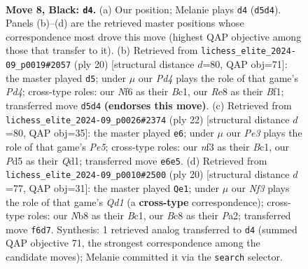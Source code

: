 \documentclass[11pt]{article}
\begin{document}
\begin{figure}[p]\centering
\begin{subfigure}{0.46\textwidth}\centering
\resizebox{\linewidth}{!}{%
\newchessgame
\chessboard[
  setfen={rnbqr1k1/pp2bppp/4pn2/2pp4/2P5/1P3NPB/P2PPPKP/RNBQ1R2 b - - 3 8},
  showmover=false,
  pgfstyle=straightmove, color=movearrow, markmove={d5-d4}
]}
\caption{}
\end{subfigure}\hfill
\begin{subfigure}{0.46\textwidth}\centering
\resizebox{\linewidth}{!}{%
\newchessgame
\chessboard[
  setfen={r2qkbnr/pb1npp1p/1p4pP/2p5/3PP3/2N2N2/PP3PP1/R1BQKB1R w KQkq - 1 11},
  showmover=false,
  pgfstyle=straightmove, color=movearrow, markmove={d4-d5}
]}
\caption{}
\end{subfigure}
\\[4pt]
\begin{subfigure}{0.46\textwidth}\centering
\resizebox{\linewidth}{!}{%
\newchessgame
\chessboard[
  setfen={r1b1nrk1/pp1n1pbp/1qp3p1/2p1P3/4P3/2N2NPP/PP3PB1/R1BQ1RK1 w - - 1 12},
  showmover=false,
  pgfstyle=straightmove, color=movearrow, markmove={e5-e6}
]}
\caption{}
\end{subfigure}\hfill
\begin{subfigure}{0.46\textwidth}\centering
\resizebox{\linewidth}{!}{%
\newchessgame
\chessboard[
  setfen={r1bq1rk1/4ppbp/p1np1np1/1p6/4PP2/2NB1N2/PPP3PP/R1BQ1R1K w - - 0 11},
  showmover=false,
  pgfstyle=straightmove, color=movearrow, markmove={d1-e1}
]}
\caption{}
\end{subfigure}
\caption{\textbf{Move 8, Black: \texttt{d4}.} (a) Our position; Melanie plays \texttt{d4} (\texttt{d5d4}). Panels (b)--(d) are the retrieved master positions whose correspondence most drove this move (highest QAP objective among those that transfer to it). (b) Retrieved from \texttt{lichess\_elite\_2024-09\_p0019\#2057} (ply 20) [structural distance $d$=80, QAP obj=71]: the master played \texttt{d5}; under $\mu$ our \emph{Pd4} plays the role of that game's \emph{Pd4}; cross-type roles: our \emph{N}f6 as their \emph{B}c1, our \emph{R}e8 as their \emph{B}f1; transferred move \texttt{d5d4} \textbf{(endorses this move)}. (c) Retrieved from \texttt{lichess\_elite\_2024-09\_p0026\#2374} (ply 22) [structural distance $d$=80, QAP obj=35]: the master played \texttt{e6}; under $\mu$ our \emph{Pe3} plays the role of that game's \emph{Pe5}; cross-type roles: our \emph{n}f3 as their \emph{B}c1, our \emph{P}d5 as their \emph{Q}d1; transferred move \texttt{e6e5}. (d) Retrieved from \texttt{lichess\_elite\_2024-09\_p0010\#2500} (ply 20) [structural distance $d$=77, QAP obj=31]: the master played \texttt{Qe1}; under $\mu$ our \emph{Nf3} plays the role of that game's \emph{Qd1} (a \textbf{cross-type} correspondence); cross-type roles: our \emph{N}b8 as their \emph{B}c1, our \emph{B}c8 as their \emph{P}a2; transferred move \texttt{f6d7}. Synthesis: 1 retrieved analog transferred to \texttt{d4} (summed QAP objective 71, the strongest correspondence among the candidate moves); Melanie committed it via the \texttt{search} selector.}
\label{fig:thought-m15}
\end{figure}
\end{document}
